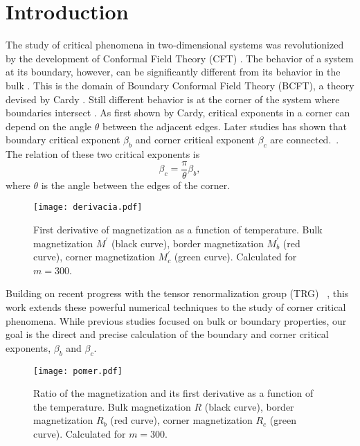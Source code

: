 \documentclass[showpacs,amssymb,twocolumn,floatfix,aps,pre,notitlepage]{revtex4-2}
\begin{document}
\section{Introduction}
The study of critical phenomena in two-dimensional systems was revolutionized by the development of Conformal Field Theory (CFT) \cite{BPZ}. The behavior of a system at its boundary, however, can be significantly different from its behavior in the bulk \cite{binder}. This is the domain of Boundary Conformal Field Theory (BCFT), a theory devised by Cardy \cite{cardy84}. Still different behavior is at the corner of the system where boundaries intersect \cite{cardy83}. As first shown by Cardy\cite{cardy83}, critical exponents in a corner can depend on the angle $\theta$ between the adjacent edges. Later studies has shown that boundary critical exponent $\beta_b$ and corner critical exponent $\beta_c$ are connected.~\cite{peschel84,peschel85,peschel88,peschel91,latremoliere,madary}. The relation of these two critical exponents is 
\begin{equation}
\beta_c = \frac\pi\theta\beta_b,
\end{equation}
where $\theta$ is the angle between the edges of the corner.

\begin{figure}[t!]
\begin{center}
\texttt{[image: derivacia.pdf]}
\caption{First derivative of magnetization as a function of temperature. Bulk magnetization $M^\prime$ (black curve), border magnetization $M_b^\prime$ (red curve), corner magnetization $M_c^\prime$ (green curve). Calculated for $m = 300$.}
\label{fig:der}
\end{center}
\end{figure}
Building on recent progress with the tensor renormalization group (TRG) ~\cite{iino2019,iino2020}, this work extends these powerful numerical techniques to the study of corner critical phenomena. While previous studies focused on bulk or boundary properties, our goal is the direct and precise calculation of the boundary and corner critical exponents, $\beta_b$ and $\beta_c$.



\begin{figure}[t!]
\begin{center}
\texttt{[image: pomer.pdf]}
\caption{Ratio of the magnetization and its first derivative as a function of the temperature. Bulk magnetization $R$ (black curve), border magnetization $R_b$ (red curve), corner magnetization $R_c$ (green curve). Calculated for $m = 300$.}
\label{fig:pomer}
\end{center}
\end{figure}
\end{document}
